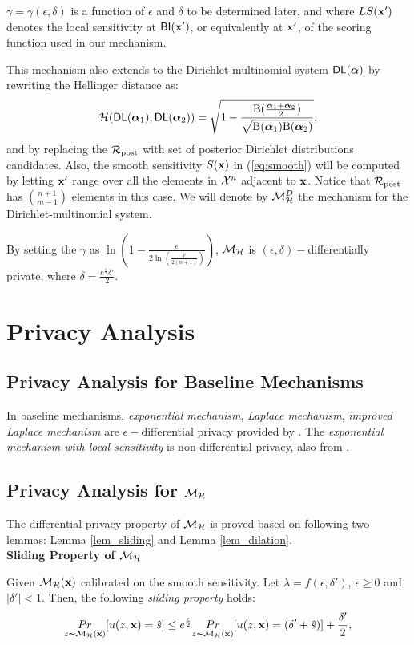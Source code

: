 \documentclass{article}
\begin{document}
$\gamma = \gamma(\epsilon, \delta)$ is a function of $\epsilon$ and $\delta$ to
be determined later, and where $LS(\textbf{x}')$ denotes the local
sensitivity at $\mathsf{BI}(\textbf{x}')$, or equivalently at $\textbf{x}'$,
of the scoring function used in our mechanism.

This mechanism also extends to the Dirichlet-multinomial system $\mathsf{DL}(\boldsymbol{\alpha})$ by rewriting the Hellinger distance as:
\[
  \mathcal{H}(\mathsf{DL}(\boldsymbol{\alpha}_1), \mathsf{DL}(\boldsymbol{\alpha}_2)) = \sqrt{1 - \frac{\textup{B}(\frac{\boldsymbol{\alpha}_1 + \boldsymbol{\alpha}_2}{2})}{\sqrt{\textup{B}(\boldsymbol{\alpha}_1) \textup{B}(\boldsymbol{\alpha}_2)}}},
\]
and by replacing the $\mathcal{R}_{\textup{post}}$ with set of posterior Dirichlet
distributions candidates. Also, the smooth sensitivity $S(\textbf{x})$
in (\ref{eq:smooth}) will be computed by letting $\textbf{x}'$ range
over all the elements in $\mathcal{X}^{n}$ adjacent to $\textbf{x}$. Notice
that $\mathcal{R}_{\textup{post}}$ has $\binom{n + 1}{m - 1}$ elements in this case. We
will denote by $\mathcal{M}^{D}_{\mathcal{H}}$ the mechanism for the
Dirichlet-multinomial system.

By setting the $\gamma$ as $\ln(1 - \frac{\epsilon}{2 \ln (\frac{\delta'}{2 (n + 1)})})$, $\mathcal{M}_{\mathcal{H}}$ is $(\epsilon, \delta) -$differentially private, where $\delta = \frac{e^{\frac{\epsilon}{2}} \delta'}{2}$.


\section{Privacy Analysis}

\subsection{Privacy Analysis for Baseline Mechanisms}
In baseline mechanisms, \emph{exponential mechanism}, \emph{Laplace mechanism}, \emph{improved Laplace mechanism} are $\epsilon-$differential privacy provided by \cite{dwork2014algorithmic}. The \emph{exponential mechanism with local sensitivity} is non-differential privacy, also from \cite{dwork2014algorithmic}.

\subsection{Privacy Analysis for $\mathcal{M}_{\mathcal{H}}$}

The differential privacy property of $\mathcal{M}_{\mathcal{H}}$ is proved based on following two lemmas: Lemma \ref{lem_sliding} and Lemma \ref{lem_dilation}.\\

\noindent \textbf{Sliding Property of $\mathcal{M}_{\mathcal{H}}$}
\begin{lem}
\label{lem_sliding}
Given $\mathcal{M}_{\mathcal{H}}(\textbf{x})$ calibrated on the smooth sensitivity. Let $\lambda = f(\epsilon,
\delta')$, $\epsilon\geq 0$ and $|\delta'| < 1$. Then, the following \emph{sliding property} holds:
\begin{equation*}
\underset{z \thicksim \mathcal{M}_{\mathcal{H}}(\textbf{x})}{Pr}[u(z,\textbf{x}) = \hat{s}]
\leq
e^{\frac{\epsilon}{2}} \underset{z \thicksim \mathcal{M}_{\mathcal{H}}(\textbf{x})}{Pr}[u(z,\textbf{x}) = (\delta' + \hat{s})] + \frac{\delta'}{2},
\end{equation*}

\end{lem}
\end{document}
